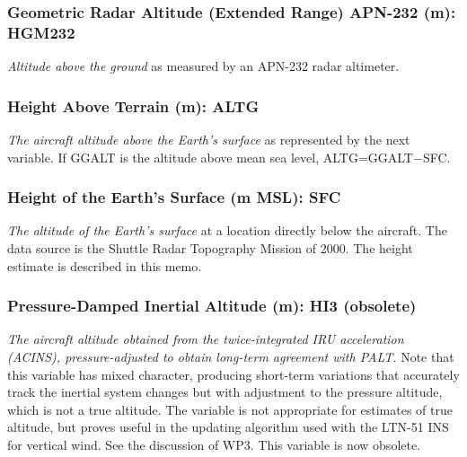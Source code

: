 \documentclass[
  english,
]{book}
\begin{document}
\hypertarget{hgm-232}{%
\subsubsection*{Geometric Radar Altitude (Extended Range) APN-232 (m):
HGM232}\label{hgm-232}}

\emph{Altitude above the ground} as measured by an APN-232 radar
altimeter.

\hypertarget{altg}{%
\subsubsection*{Height Above Terrain (m): ALTG}\label{altg}}

\emph{The aircraft altitude above the Earth's surface} as represented by
the next variable. If GGALT is the altitude above mean sea level,
ALTG=GGALT{−}SFC.

\hypertarget{sfc}{%
\subsubsection*{Height of the Earth's Surface (m MSL): SFC}\label{sfc}}

\emph{The altitude of the Earth's surface} at a location directly below
the aircraft. The data source is the Shuttle Radar Topography Mission of
2000. The height estimate is described in this memo.

\hypertarget{hi3}{%
\subsubsection*{Pressure-Damped Inertial Altitude (m): HI3
(obsolete)}\label{hi3}}

\emph{The aircraft altitude obtained from the twice-integrated IRU
acceleration (ACINS), pressure-adjusted to obtain long-term agreement
with PALT.} Note that this variable has mixed character, producing
short-term variations that accurately track the inertial system changes
but with adjustment to the pressure altitude, which is not a true
altitude. The variable is not appropriate for estimates of true
altitude, but proves useful in the updating algorithm used with the
LTN-51 INS for vertical wind. See the discussion of WP3. This variable
is now obsolete.
\end{document}
